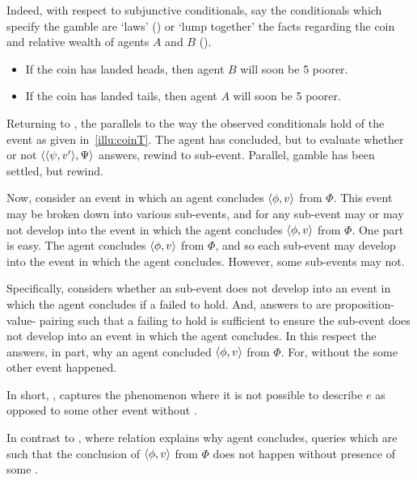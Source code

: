 \begin{note}
{    Indeed, with respect to subjunctive conditionals, say the conditionals which specify the gamble are `laws' (\cite{Chisholm:1955aa,Lewis:1979vm,Veltman:2005tj}) or `lump together' the facts regarding the coin and relative wealth of agents \(A\) and \(B\) (\cite{Kratzer:1981aa,Kratzer:1989aa}).
  }

  \begin{itemize}[noitemsep]
  \item
    If the coin has landed heads, then agent \(B\) will soon be \texteuro{}5 poorer.
  \item
    If the coin has landed tails, then agent \(A\) will soon be \texteuro{}5 poorer.
  \end{itemize}
\end{note}

\begin{note}
  Returning to \qWhyV{}, the \itc{} parallels to the way the observed conditionals hold of the event as given in~\autoref{illu:coinT}.
  The agent has concluded, but to evaluate whether or not \(\langle \langle \psi, v' \rangle, \Psi \rangle\) answers, rewind to sub-event.
  Parallel, gamble has been settled, but rewind.

  Now, consider an event in which an agent concludes \(\langle \phi, v \rangle\) from \(\Phi\).
  This event may be broken down into various sub-events, and for any sub-event may or may not develop into the event in which the agent concludes \(\langle \phi, v \rangle\) from \(\Phi\).
  One part is easy.
  The agent concludes \(\langle \phi, v \rangle\) from \(\Phi\), and so each sub-event may develop into the event in which the agent concludes.
  However, some sub-events may not.

  Specifically, \qWhyV{} considers whether an sub-event does not develop into an event in which the agent concludes if a \ros{} failed to hold.
  And, answers to \qWhyV{} are proposition-value-\pool{} pairing such that a \ros{} failing to hold is sufficient to ensure the sub-event does not develop into an event in which the agent concludes.
  In this respect the \ros{} answers, in part, why an agent concluded \(\langle \phi, v \rangle\) from \(\Phi\).
  For, without the \ros{} some other event happened.
\end{note}

\begin{note}
  In short, \qWhyV{}, captures the phenomenon where it is not possible to describe \(e\) as opposed to some other event without \ros{}.

  In contrast to \qWhy{}, where relation explains why agent concludes, \qWhyV{} queries which  are such that the conclusion of \(\langle \phi, v \rangle\) from \(\Phi\) does not happen without presence of some .
\end{note}

